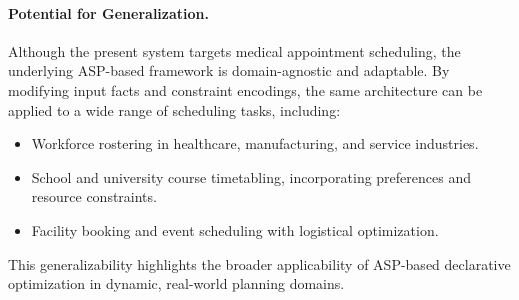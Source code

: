 \documentclass{tlp}
\begin{document}
\paragraph{Potential for Generalization.}
\label{sec:generalization}

Although the present system targets medical appointment scheduling, the underlying ASP-based framework is domain-agnostic and adaptable. By modifying input facts and constraint encodings, the same architecture can be applied to a wide range of scheduling tasks, including:
\begin{itemize}
    \item Workforce rostering in healthcare, manufacturing, and service industries.
    \item School and university course timetabling, incorporating preferences and resource constraints.
    \item Facility booking and event scheduling with logistical optimization.
\end{itemize}
This generalizability highlights the broader applicability of ASP-based declarative optimization in dynamic, real-world planning domains.
\end{document}
